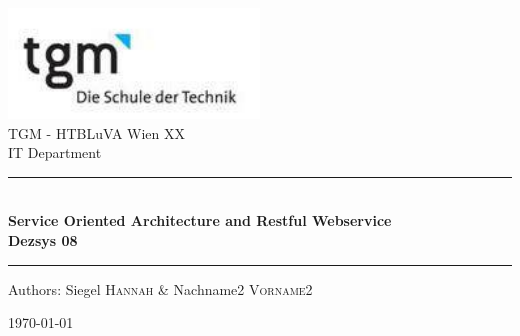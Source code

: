 \documentclass[12pt]{article}
\begin{document}
\begin{titlepage}
\begin{center}
\includegraphics[width=0.5\textwidth]{images/logo}\\[1cm]    

\LARGE TGM - HTBLuVA Wien XX \\ IT Department  \\[1.5cm]

\rule{1.0\textwidth}{1mm}
{ \huge \bfseries \\[0.4cm]  \huge Service Oriented Architecture and Restful Webservice \\ \LARGE Dezsys 08  \\[0.4cm] }

\rule{1.0\textwidth}{1mm}



\noindent 
\vspace{5cm}

\begin{center}
\large
Authors: 
Siegel \textsc{Hannah} \&
Nachname2 \textsc{Vorname2}
\end{center}

\vfill

{\large \today}

\end{center}
\end{titlepage}

\tableofcontents


\ohead{\headmark}

\newpage
\end{document}
